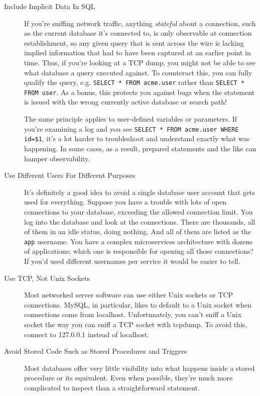 \documentclass{vivid_layout}
\begin{document}
\begin{description}

\item[Include Implicit Data In SQL]
If you're sniffing network traffic, anything \emph{stateful} about
a connection, such as the current database it's connected to, is only observable at
connection establishment, so any given query that is sent across the wire is
lacking implied information that had to have been captured at an earlier point
in time. Thus, if you're looking at a TCP dump, you might not be able to see
what database a query executed against. To counteract this, you can fully
qualify the query, e.g. \texttt{SELECT * FROM acme.user} rather than
\texttt{SELECT * FROM user}. As a bonus, this protects you against bugs when the
statement is issued with the wrong currently active database or search path!

The same principle applies to user-defined variables or parameters. If you're
examining a log and you see \texttt{SELECT * FROM acme.user WHERE id=\$1}, it's a
lot harder to troubleshoot and understand exactly what was happening. In some
cases, as a result, prepared statements and the like can hamper observability.

\item[Use Different Users For Different Purposes] It's definitely a good idea to
avoid a single database user account that gets used for everything. Suppose you
have a trouble with lots of open connections to your database, exceeding the
allowed connection limit. You log into the database and look at the connections.
There are thousands, all of them in an idle status, doing nothing. And all of
them are listed as the \texttt{app} username. You have a complex microservices
architecture with dozens of applications; which one is responsible for opening
all those connections? If you'd used different usernames per service it would be
easier to tell.

\item[Use TCP, Not Unix Sockets] Most networked server software can use either
Unix sockets or TCP connections. MySQL, in particular, likes to default to a
Unix socket when connections come from localhost. Unfortunately, you can't sniff
a Unix socket the way you can sniff a TCP socket with tcpdump. To avoid this,
connect to 127.0.0.1 instead of localhost.

\item[Avoid Stored Code Such as Stored Procedures and Triggers] Most databases
offer very little visibility into what happens inside a stored procedure or its
equivalent. Even when possible, they're much more complicated to inspect 
than a straightforward statement.

\end{description}
\end{document}
